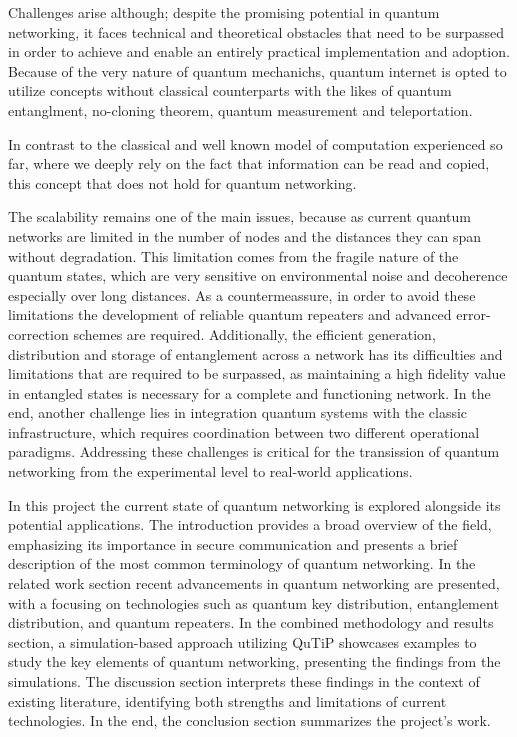 		Challenges arise although; despite the promising potential in quantum networking,
		it faces technical and theoretical obstacles that need to be surpassed
		in order to achieve and enable an entirely practical implementation and adoption.
		Because of the very nature of quantum mechanichs, quantum internet is opted to utilize concepts
		without classical counterparts with the likes of quantum entanglment,
		no-cloning theorem, quantum measurement and teleportation.
		
		In contrast to the classical and well known model of computation experienced so far,
		where we deeply rely on the fact that information can be read and copied, this concept that does not hold
		for quantum networking. 
		
		The scalability remains one of the main issues,
		because as current quantum networks are limited in the number of nodes and the
		distances they can span without degradation.
		This limitation comes from the fragile nature of the quantum states,
		which are very sensitive on environmental noise and decoherence especially over long distances.
		As a countermeassure, in order to avoid these limitations the development of reliable quantum repeaters
		and advanced error-correction schemes are required.	
		Additionally, the efficient generation, distribution and storage of entanglement 
		across a network has its difficulties and limitations that are required to be surpassed, 
		as maintaining a high fidelity value in entangled
		states is necessary for a complete and functioning network.
		In the end, another challenge lies in integration
	        quantum systems with the classic infrastructure,
	        which requires coordination between
	        two different operational paradigms.
	        Addressing these challenges is critical for the transission of 
		quantum networking from the experimental level to real-world applications.

		In this project the current state of quantum networking is explored alongside its potential applications. 
		The introduction provides a broad overview of the field, emphasizing its importance in secure communication and presents a brief
		description of the most common terminology of quantum networking.	
		In the related work section recent advancements in quantum networking are presented, with a focusing on technologies such as 
		quantum key distribution, entanglement distribution, and quantum repeaters. 
		In the combined methodology and results section, a simulation-based approach utilizing QuTiP 
		showcases examples to study the key elements of quantum networking, presenting the findings from the simulations.
		The discussion section interprets these findings in the context of existing literature, 
		identifying both strengths and limitations of current technologies. 
		In the end, the conclusion section summarizes the project's work.


